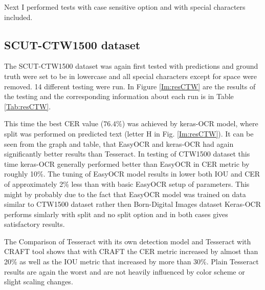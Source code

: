 Next I performed tests with case sensitive option and with special characters included.

\subsection*{SCUT-CTW1500 dataset}
The SCUT-CTW1500 dataset was again first tested with predictions and ground truth were set to be in lowercase and all special characters except for space were removed. 14 different testing were run.  In Figure \ref*{Im:resCTW} are the results of the testing and the corresponding information about each run is in Table \ref*{Tab:resCTW}. 

This time the best CER value ($76.4\%$) was achieved by keras-OCR model, where split was performed on predicted text (letter H in Fig. \ref*{Im:resCTW}). It can be seen from the graph and table, that EasyOCR and keras-OCR had again significantly better results than Tesseract. In testing of CTW1500 dataset this time keras-OCR generally performed better than EasyOCR in CER metric by roughly 10\%. The tuning of EasyOCR model results in lower both IOU and CER of approximately 2\% less than with basic EasyOCR setup of parameters. This might by probably due to the fact that EasyOCR model was trained on data similar to CTW1500 dataset rather then Born-Digital Images dataset Keras-OCR performs simlarly with split and no split option and in both cases gives satisfactory results.

The Comparison of Tesseract with its own detection model and Tesseract with CRAFT tool shows that with CRAFT the CER metric increased by almost than 20\% as well as the IOU metric that increased by more than 30\%. Plain Tesseract results are again the worst and are not heavily influenced by color scheme or slight scaling changes. 

